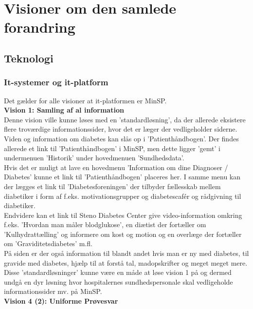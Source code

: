 \section{Visioner om den samlede forandring}
\subsection{Teknologi}
%
%
\subsubsection{It-systemer og it-platform}
Det gælder for alle visioner at it-platformen er MinSP.\\
\textbf{Vision 1: Samling af al information} \\
 Denne vision ville kunne løses med en 'standardløsning', da der allerede eksistere flere troværdige informationssider, hvor det er læger der vedligeholder siderne. \\
 Viden og information om diabetes kan slås op i 'Patienthåndbogen'. Der findes allerede et link til 'Patienthåndbogen' i MinSP, men dette ligger 'gemt' i undermenuen 'Historik' under hovedmenuen 'Sundhedsdata'.\\
 Hvis det er muligt at lave en hovedmenu 'Information om dine Diagnoser / Diabetes' kunne et link til 'Patienthåndbogen' placeres her. I samme menu kan der lægges et link til 'Diabetesforeningen' der tilbyder fællesskab mellem diabetiker i form af f.eks. motivationsgrupper og diabetescafér og rådgivning til diabetiker.\\
 Endvidere kan et link til Steno Diabetes Center give video-information omkring f.eks. 'Hvordan man måler blodglukose', en diætist der fortæller om 'Kulhydrattælling' og informere om kost og motion og en overlæge der fortæller om 'Graviditetsdiabetes' m.fl. \\
 På siden er der også information til blandt andet hvis man er ny med diabetes, til gravide med diabetes, hjælp til at forstå tal, madopskrifter og meget meget mere. \\ 
 Disse 'standardløsninger' kunne være en måde at løse vision 1 på og dermed undgå en dyr løsning hvor hospitalernes sundhedspersonale skal vedligeholde informationssider mv. på MinSP.\\
 \textbf{Vision 4 (2): Uniforme Prøvesvar} \\
